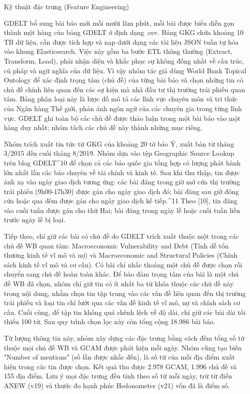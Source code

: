 Kỹ thuật đặc trưng (Feature Engineering)

GDELT bổ sung bài báo mới mỗi mười lăm phút, mỗi bài được biểu diễn gọn thành một hàng của bảng GDELT ở định dạng .csv. Bảng GKG chứa khoảng 10 TB dữ liệu, cần được tích hợp và nạp dưới dạng các tài liệu JSON tuần tự hóa vào khung Elasticsearch. Việc này gồm ba bước ETL thông thường (Extract, Transform, Load), phải nhận diện và khắc phục sự không đồng nhất về cấu trúc, cú pháp và ngữ nghĩa của dữ liệu. Vì vậy nhóm tác giả dùng World Bank Topical Ontology để xác định trọng tâm (chủ đề) của từng bài báo và chọn những tin có chủ đề chính liên quan đến các sự kiện mà nhà đầu tư thị trường trái phiếu quan tâm. Bảng phân loại này là lược đồ mô tả các lĩnh vực chuyên môn và tri thức của Ngân hàng Thế giới, phản ánh ngôn ngữ của các chuyên gia trong từng lĩnh vực. GDELT ghi toàn bộ các chủ đề được thảo luận trong một bài báo vào một hàng duy nhất; nhóm tách các chủ đề này thành những mục riêng.

Nhóm trích xuất tin tức từ GKG của khoảng 20 tờ báo Ý, xuất bản từ tháng 3/2015 đến cuối tháng 8/2019. Nhóm dựa vào tệp Geographic Source Lookup trên blog GDELT\^{}10 để chọn cả các báo quốc gia tổng hợp có lượng phát hành lớn nhất lẫn các báo chuyên về tài chính và kinh tế. Sau khi thu thập, tin được ánh xạ vào ngày giao dịch tương ứng: các bài đăng trong giờ mở cửa thị trường trái phiếu (9h00-17h30) được gán cho ngày giao dịch đó; bài đăng sau giờ đóng cửa hoặc qua đêm được gán cho ngày giao dịch kế tiếp.\^{}11 Theo {[}10{]}, tin đăng vào cuối tuần được gán cho thứ Hai; bài đăng trong ngày lễ hoặc cuối tuần liền trước ngày lễ bị loại.

Tiếp theo, chỉ giữ các bài có chủ đề do GDELT trích xuất thuộc một trong các chủ đề WB quan tâm: Macroeconomic Vulnerability and Debt (Tính dễ tổn thương kinh tế vĩ mô và nợ) và Macroeconomic and Structural Policies (Chính sách kinh tế vĩ mô và cơ cấu). Có bài chỉ nhắc thoáng một chủ đề được chọn rồi chuyển sang chủ đề hoàn toàn khác. Để bảo đảm trọng tâm của bài là một chủ đề WB đã chọn, nhóm chỉ giữ tin có ít nhất ba từ khóa thuộc các chủ đề này trong nội dung, nhằm chọn tin tập trung vào các vấn đề liên quan đến thị trường trái phiếu và loại tin chỉ lướt qua các vấn đề kinh tế vĩ mô, nợ và chính sách cơ cấu. Cuối cùng, để tập tin không quá chênh lệch về độ dài, chỉ giữ các bài dài tối thiểu 100 từ. Sau quy trình chọn lọc này còn tổng cộng 18.986 bài báo.

Từ lượng thông tin này, nhóm xây dựng các đặc trưng bằng cách đếm tổng số từ thuộc mọi chủ đề WB và GCAM được phát hiện mỗi ngày. Nhóm cũng tạo biến "Number of mentions" (số lần được nhắc đến), là số từ của mỗi địa điểm xuất hiện trong các tin được chọn. Kết quả thu được 2.978 GCAM, 1.996 chủ đề và 155 địa điểm. Lưu ý mọi đặc trưng đều tính theo số từ mỗi ngày, trừ từ điển ANEW (v19) và thước đo hạnh phúc Hedonometer (v21) vốn đã là điểm số.


